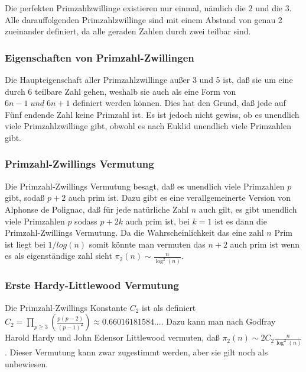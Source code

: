 Die perfekten Primzahlzwillinge existieren nur einmal, nämlich die $2$ und die $3$. Alle darauffolgenden Primzahlzwillinge sind mit einem Abstand von genau 2 zueinander definiert, da alle geraden Zahlen durch zwei teilbar sind. 
\subsubsection{Eigenschaften von Primzahl-Zwillingen}
Die Haupteigenschaft aller Primzahlzwillinge außer 3 und 5 ist, daß sie um eine durch 6 teilbare Zahl gehen, weshalb sie auch als eine Form von $6n-1\;und\;6n+1$ definiert werden können. Dies hat den Grund, daß jede auf Fünf endende Zahl keine Primzahl ist. Es ist jedoch nicht gewiss, ob es unendlich viele Primzahlzwillinge gibt, obwohl es nach Euklid unendlich viele Primzahlen gibt.
\subsubsection{Primzahl-Zwillings Vermutung}
Die Primzahl-Zwillings Vermutung besagt, daß es unendlich viele Primzahlen $p$ gibt, sodaß $p+2$ auch prim ist. Dazu gibt es eine verallgemeinerte Version von Alphonse de Polignac, daß für jede natürliche Zahl $n$ auch gilt, es gibt unendlich viele Primzahlen $p$ sodass $p+2k$ auch prim ist, bei $k=1$ ist es dann die Primzahl-Zwillings Vermutung. Da die Wahrscheinlichkeit das eine zahl $n$ Prim ist liegt bei $1/log(n)$ somit könnte man vermuten das $n+2$ auch prim ist wenn es als eigenständige zahl sieht $\pi_2(n)\sim\frac{n}{\log^2(n)}$.
\subsubsection{Erste Hardy-Littlewood Vermutung}
Die Primzahl-Zwillings Konstante $C_2$ ist als definiert $C_2=\prod\limits_{p\geq3}(\frac{p(p-2)}{(p-1)^2})\approx0.66016181584...$.
Dazu kann man nach Godfray Harold Hardy und John Edensor Littlewood vermuten, daß $\pi_2(n)\sim2C_2\frac{n}{\log^2(n)}$.
Dieser Vermutung kann zwar zugestimmt werden, aber sie gilt noch als unbewiesen.
